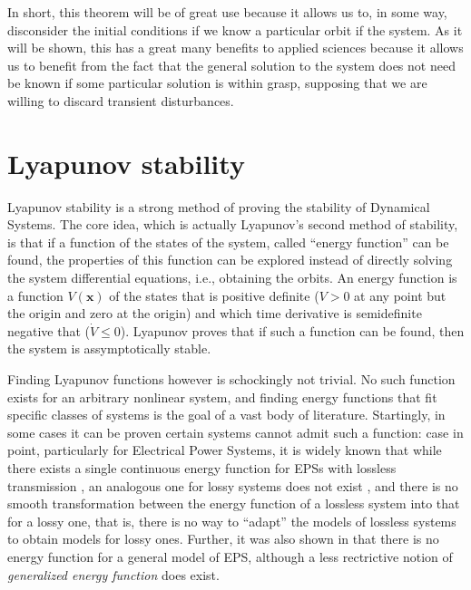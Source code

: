 	In short, this theorem will be of great use because it allows us to, in some way, disconsider the initial conditions if we know a particular orbit if the system. As it will be shown, this has a great many benefits to applied sciences because it allows us to benefit from the fact that the general solution to the system does not need be known if some particular solution is within grasp, supposing that we are willing to discard transient disturbances.

\section{Lyapunov stability} %

	Lyapunov stability is a strong method of proving the stability of Dynamical Systems. The core idea, which is actually Lyapunov's second method of stability, is that if a function of the states of the system, called ``energy function'' can be found, the properties of this function can be explored instead of directly solving the system differential equations, i.e., obtaining the orbits. An energy function is a function $V\left(\mathbf{x}\right)$ of the states that is positive definite ($V > 0$ at any point but the origin and zero at the origin) and which time derivative is semidefinite negative that ($\dot{V} \leq 0$). Lyapunov proves that if such a function can be found, then the system is assymptotically stable.

	Finding Lyapunov functions however is schockingly not trivial. No such function exists for an arbitrary nonlinear system, and finding energy functions that fit specific classes of systems is the goal of a vast body of literature. Startingly, in some cases it can be proven certain systems cannot admit such a function: case in point, particularly for Electrical Power Systems, it is widely known that while there exists a single continuous energy function for EPSs with lossless transmission , an analogous one for lossy systems does not exist , and there is no smooth transformation between the energy function of a lossless system into that for a lossy one, that is, there is no way to ``adapt'' the models of lossless systems to obtain models for lossy ones. Further, it was also shown in \cite{albertoDevelopmentGeneralizedEnergy2012} that there is no energy function for a general model of EPS, although a less rectrictive notion of \textit{generalized energy function} does exist.

